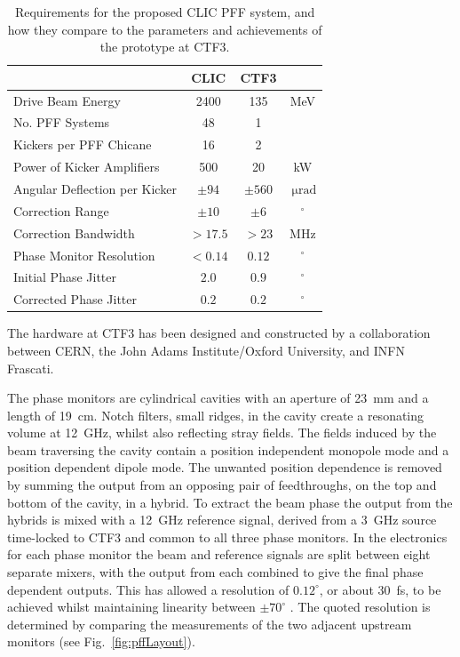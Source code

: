 \documentclass[%
 reprint,
 superscriptaddress,
 amsmath,
 amssymb,
 prl,
]{revtex4-1}
\begin{document}
\begin{table}
	\caption{\label{tab:pffspecs}
	    Requirements for the proposed CLIC PFF system, and how they compare to 
	    the parameters and achievements of the prototype at CTF3.}
\begin{ruledtabular}
	\begin{tabular}{lccc}
		 & CLIC & CTF3 \\
		\hline
		Drive Beam Energy & 2400 & 135 & MeV \\
		No. PFF Systems & 48 & 1 & \\
		Kickers per PFF Chicane & 16 & 2 & \\
		Power of Kicker Amplifiers & 500 & 20 & kW \\
		Angular Deflection per Kicker & \(\pm94\) & 
		\(\pm560\) & \(~\mathrm{\mu rad}\) \\
		Correction Range & \(\pm 10\) & \(\pm 6\) & \(^\circ\) \\
		Correction Bandwidth & \(>17.5\) & \(>23\) & MHz \\
		Phase Monitor Resolution & \(< 0.14\) & \(0.12\) &  \(^\circ\)   \\
		Initial Phase Jitter & \(2.0\) & \(0.9\) &  \(^\circ\)  \\
		Corrected Phase Jitter & \(0.2\) & \(0.2\) &  \(^\circ\)  \\
	\end{tabular}
\end{ruledtabular}
\end{table}

The hardware at CTF3 has been designed and constructed by a collaboration 
between CERN, the John Adams Institute/Oxford University, and INFN Frascati.

The phase monitors \cite{phMonEuCard} are cylindrical cavities with an aperture 
of 23~mm and a length of 19~cm. Notch filters, small ridges, in the cavity 
create a resonating volume at 12~GHz, whilst also reflecting stray fields.
The fields induced by the beam traversing the cavity contain a position 
independent monopole mode and a position dependent dipole mode. The unwanted 
position dependence is removed by summing the output from an opposing pair 
of feedthroughs, on the top and bottom of the cavity, in a hybrid. 
To extract the beam phase the output from the hybrids 
is mixed with a 12~GHz reference signal, derived from a 3~GHz source 
time-locked to CTF3 and common to all three phase monitors.
In the electronics for each phase monitor the beam and reference signals are 
split between eight separate mixers, with the output from each combined to give 
the final phase dependent outputs. This has allowed a resolution of 
\(0.12^\circ\), or about 30~fs, to be achieved whilst maintaining linearity 
between \(\pm70^\circ\) \cite{RobertsThesis}. The quoted resolution 
is determined by comparing the measurements of the two adjacent upstream 
monitors (see Fig.~\ref{fig:pffLayout}).
\end{document}
